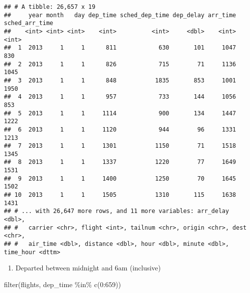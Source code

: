 \documentclass[
]{article}
\newenvironment{Shaded}{\begin{snugshade}}{\end{snugshade}}
\newcommand{\DecValTok}[1]{\textcolor[rgb]{0.00,0.00,0.81}{#1}}
\newcommand{\FunctionTok}[1]{\textcolor[rgb]{0.00,0.00,0.00}{#1}}
\newcommand{\NormalTok}[1]{#1}
\newcommand{\SpecialCharTok}[1]{\textcolor[rgb]{0.00,0.00,0.00}{#1}}
\providecommand{\tightlist}{%
  \setlength{\itemsep}{0pt}\setlength{\parskip}{0pt}}
\begin{document}
\begin{verbatim}
## # A tibble: 26,657 x 19
##     year month   day dep_time sched_dep_time dep_delay arr_time sched_arr_time
##    <int> <int> <int>    <int>          <int>     <dbl>    <int>          <int>
##  1  2013     1     1      811            630       101     1047            830
##  2  2013     1     1      826            715        71     1136           1045
##  3  2013     1     1      848           1835       853     1001           1950
##  4  2013     1     1      957            733       144     1056            853
##  5  2013     1     1     1114            900       134     1447           1222
##  6  2013     1     1     1120            944        96     1331           1213
##  7  2013     1     1     1301           1150        71     1518           1345
##  8  2013     1     1     1337           1220        77     1649           1531
##  9  2013     1     1     1400           1250        70     1645           1502
## 10  2013     1     1     1505           1310       115     1638           1431
## # ... with 26,647 more rows, and 11 more variables: arr_delay <dbl>,
## #   carrier <chr>, flight <int>, tailnum <chr>, origin <chr>, dest <chr>,
## #   air_time <dbl>, distance <dbl>, hour <dbl>, minute <dbl>, time_hour <dttm>
\end{verbatim}

\begin{enumerate}
\def\labelenumi{\arabic{enumi}.}
\setcounter{enumi}{6}
\tightlist
\item
  Departed between midnight and 6am (inclusive)
\end{enumerate}

\begin{Shaded}
\begin{Highlighting}[]
\FunctionTok{filter}\NormalTok{(flights, dep\_time }\SpecialCharTok{\%in\%} \FunctionTok{c}\NormalTok{(}\DecValTok{0}\SpecialCharTok{:}\DecValTok{659}\NormalTok{))}
\end{Highlighting}
\end{Shaded}
\end{document}
